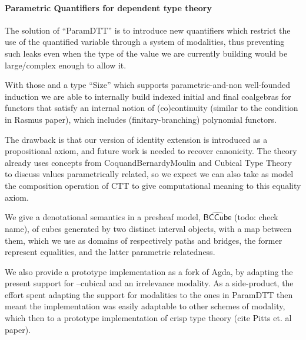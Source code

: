 \documentclass{book}
\newcommand{\U}{\mathsf{U}}
\newcommand{\sd}{.\,}
\begin{document}

\paragraph{Parametric Quantifiers for dependent type theory}
    The solution of ``ParamDTT'' is to introduce new quantifiers which
    restrict the use of the quantified variable through a system of
    modalities, thus preventing such leaks even when the type of the
    value we are currently building would be large/complex enough to
    allow it.

    With those and a type ``Size'' which supports parametric-and-non
    well-founded induction we are able to internally build indexed
    initial and final coalgebras for functors that satisfy an
    internal notion of (co)continuity (similar to the condition in
    Rasmus paper), which includes (finitary-branching) polynomial
    functors.

    The drawback is that our version of identity extension is
    introduced as a propositional axiom, and future work is needed to
    recover canonicity. The theory already uses concepts from
    CoquandBernardyMoulin and Cubical Type Theory to discuss values
    parametrically related, so we expect we can also take as model the
    composition operation of CTT to give computational meaning to this
    equality axiom.

    We give a denotational semantics in a presheaf model,
    $\hat{\mathsf{BCCube}}$ (todo: check name), of cubes generated by two distinct interval
    objects, with a map between them, which we use as domains of
    respectively paths and bridges, the former represent equalities,
    and the latter parametric relatedness.

    We also provide a prototype implementation as a fork of Agda, by
    adapting the present support for --cubical and an irrelevance
    modality. As a side-product, the effort spent adapting the support
    for modalities to the ones in ParamDTT then meant the
    implementation was easily adaptable to other schemes of modality,
    which then to a prototype implementation of crisp type theory
    (cite Pitts et. al paper).
\end{document}
